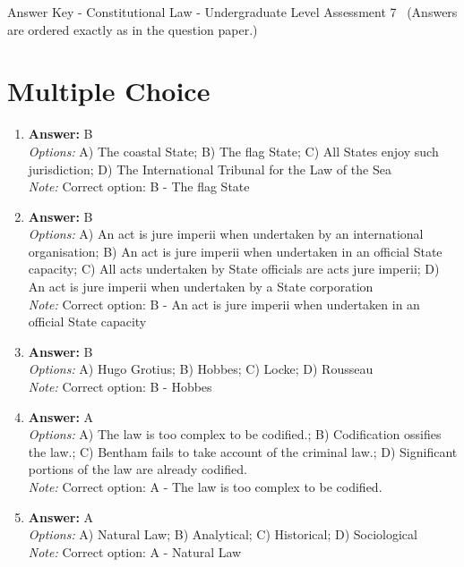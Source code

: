 \documentclass[12pt]{article}
\begin{document}
\begin{center}
Answer Key - Constitutional Law - Undergraduate Level Assessment 7 \
\small (Answers are ordered exactly as in the question paper.)
\end{center}

\section*{Multiple Choice}
\begin{enumerate}[label=\arabic*.]
\item \textbf{Answer:} B
\\ \textit{Options:} A) The coastal State; B) The flag State; C) All States enjoy such jurisdiction; D) The International Tribunal for the Law of the Sea
\\ \textit{Note:} Correct option: B - The flag State
\item \textbf{Answer:} B
\\ \textit{Options:} A) An act is jure imperii when undertaken by an international organisation; B) An act is jure imperii when undertaken in an official State capacity; C) All acts undertaken by State officials are acts jure imperii; D) An act is jure imperii when undertaken by a State corporation
\\ \textit{Note:} Correct option: B - An act is jure imperii when undertaken in an official State capacity
\item \textbf{Answer:} B
\\ \textit{Options:} A) Hugo Grotius; B) Hobbes; C) Locke; D) Rousseau
\\ \textit{Note:} Correct option: B - Hobbes
\item \textbf{Answer:} A
\\ \textit{Options:} A) The law is too complex to be codified.; B) Codification ossifies the law.; C) Bentham fails to take account of the criminal law.; D) Significant portions of the law are already codified.
\\ \textit{Note:} Correct option: A - The law is too complex to be codified.
\item \textbf{Answer:} A
\\ \textit{Options:} A) Natural Law; B) Analytical; C) Historical; D) Sociological
\\ \textit{Note:} Correct option: A - Natural Law
\end{enumerate}
\end{document}
